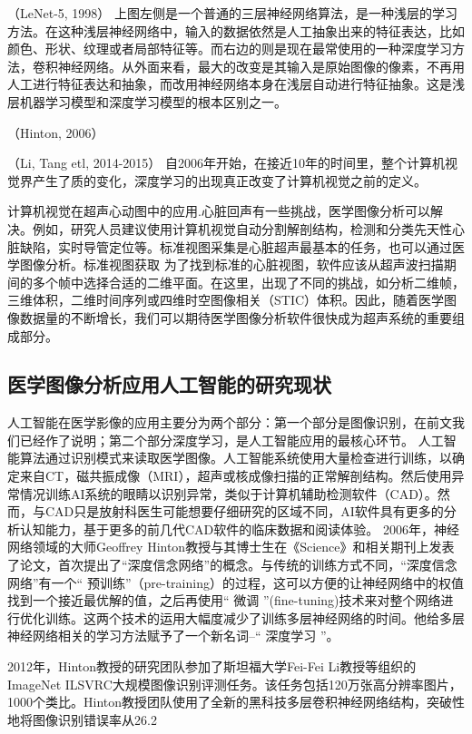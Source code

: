 （LeNet-5, 1998）
上图左侧是一个普通的三层神经网络算法，是一种浅层的学习方法。在这种浅层神经网络中，输入的数据依然是人工抽象出来的特征表达，比如颜色、形状、纹理或者局部特征等。而右边的则是现在最常使用的一种深度学习方法，卷积神经网络。从外面来看，最大的改变是其输入是原始图像的像素，不再用人工进行特征表达和抽象，而改用神经网络本身在浅层自动进行特征抽象。这是浅层机器学习模型和深度学习模型的根本区别之一。

（Hinton, 2006）

（Li, Tang etl, 2014-2015）
自2006年开始，在接近10年的时间里，整个计算机视觉界产生了质的变化，深度学习的出现真正改变了计算机视觉之前的定义。


计算机视觉在超声心动图中的应用.心脏回声有一些挑战，医学图像分析可以解决。例如，研究人员建议使用计算机视觉自动分割解剖结构，检测和分类先天性心脏缺陷，实时导管定位等。标准视图采集是心脏超声最基本的任务，也可以通过医学图像分析。标准视图获取 为了找到标准的心脏视图，软件应该从超声波扫描期间的多个帧中选择合适的二维平面。在这里，出现了不同的挑战，如分析二维帧，三维体积，二维时间序列或四维时空图像相关（STIC）体积。因此，随着医学图像数据量的不断增长，我们可以期待医学图像分析软件很快成为超声系统的重要组成部分。
 


\subsection{医学图像分析应用人工智能的研究现状}


人工智能在医学影像的应用主要分为两个部分：第一个部分是图像识别，在前文我们已经作了说明；第二个部分深度学习，是人工智能应用的最核心环节。
人工智能算法通过识别模式来读取医学图像。人工智能系统使用大量检查进行训练，以确定来自CT，磁共振成像（MRI），超声或核成像扫描的正常解剖结构。然后使用异常情况训练AI系统的眼睛以识别异常，类似于计算机辅助检测软件（CAD）。然而，与CAD只是放射科医生可能想要仔细研究的区域不同，AI软件具有更多的分析认知能力，基于更多的前几代CAD软件的临床数据和阅读体验。
2006年，神经网络领域的大师Geoffrey Hinton教授与其博士生在《Science》和相关期刊上发表了论文，首次提出了“深度信念网络”的概念。与传统的训练方式不同，“深度信念网络”有一个“ 预训练”（pre-training）的过程，这可以方便的让神经网络中的权值找到一个接近最优解的值，之后再使用“ 微调 ”(fine-tuning)技术来对整个网络进行优化训练。这两个技术的运用大幅度减少了训练多层神经网络的时间。他给多层神经网络相关的学习方法赋予了一个新名词–“ 深度学习 ”。

2012年，Hinton教授的研究团队参加了斯坦福大学Fei-Fei Li教授等组织的ImageNet ILSVRC大规模图像识别评测任务。该任务包括120万张高分辨率图片，1000个类比。Hinton教授团队使用了全新的黑科技多层卷积神经网络结构，突破性地将图像识别错误率从26.2%

